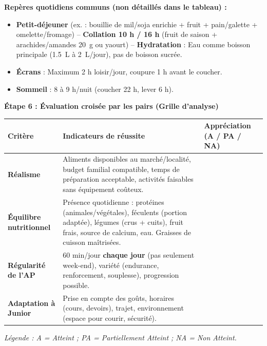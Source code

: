 \documentclass[11pt]{article}
\begin{document}
\begin{exoresolu}
\textbf{Repères quotidiens communs (non détaillés dans le tableau) :}
\begin{itemize}
\item \textbf{Petit-déjeuner} (ex. : bouillie de mil/soja enrichie + fruit + pain/galette + omelette/fromage) -- \textbf{Collation 10 h / 16 h} (fruit de saison + arachides/amandes \SI{20}{g} ou yaourt) -- \textbf{Hydratation} : Eau comme boisson principale (\SI{1,5}{L} à \SI{2}{L}/jour), pas de boisson sucrée.
\item \textbf{Écrans} : Maximum 2 h loisir/jour, coupure 1 h avant le coucher.
\item \textbf{Sommeil} : 8 à 9 h/nuit (coucher 22 h, lever 6 h).
\end{itemize}

\textbf{Étape 6 : Évaluation croisée par les pairs (Grille d'analyse)}

\begin{center}
\begin{tabularx}{\linewidth}{|l|X|X|}
\hline
\rowcolor{popblueL} \textbf{Critère} & \textbf{Indicateurs de réussite} & \textbf{Appréciation (A / PA / NA)} \\
\hline
\textbf{Réalisme} & Aliments disponibles au marché/localité, budget familial compatible, temps de préparation acceptable, activités faisables sans équipement coûteux. & \\
\hline
\textbf{Équilibre nutritionnel} & Présence quotidienne : protéines (animales/végétales), féculents (portion adaptée), légumes (crus + cuits), fruit frais, source de calcium, eau. Graisses de cuisson maîtrisées. & \\
\hline
\textbf{Régularité de l'AP} & 60 min/jour \textbf{chaque jour} (pas seulement week-end), variété (endurance, renforcement, souplesse), progression possible. & \\
\hline
\textbf{Adaptation à Junior} & Prise en compte des goûts, horaires (cours, devoirs), trajet, environnement (espace pour courir, sécurité). & \\
\hline
\end{tabularx}
\end{center}
\emph{Légende : A = Atteint ; PA = Partiellement Atteint ; NA = Non Atteint.}
\end{exoresolu}
\end{document}
